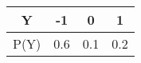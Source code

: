 \begin{center}
\begin{tabular}{|c|c|c|c|} 
    \hline
    Y & -1 & 0 & 1 \\ 
    \hline
    P(Y) & 0.6 & 0.1 & 0.2 \\ 
    \hline
\end{tabular}
\end{center}
    